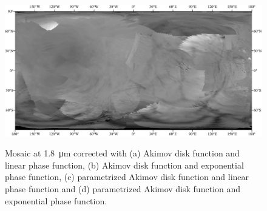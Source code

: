 \documentclass{arxiv-icarus}
\begin{document}
\begin{landscape}
\begin{figure}[!ht]
        {\includegraphics[height=.25\linewidth]{Fig_S1d}}\\
        \vspace{.5cm}
        \caption{Mosaic at \SI{1.8}{\um} corrected with (a) Akimov disk function and linear phase function, (b) Akimov disk function and exponential phase function, (c) parametrized Akimov disk function and linear phase function and (d) parametrized Akimov disk function and exponential phase function.}
        \label{fig:fig_S1}
    \end{figure}
\end{landscape}
\end{document}
